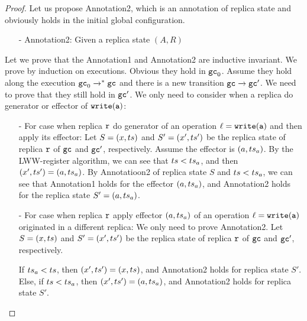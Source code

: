 \begin {proof}
Let us propose Annotation2, which is an annotation of replica state and obviously holds in the initial global configuration.

\begin{itemize}
\setlength{\itemsep}{0.5pt}
\item[-] Annotation2: Given a replica state $(A,R)$
\end{itemize}


Let we prove that the Annotation1 and Annotation2 are inductive invariant. We prove by induction on executions. Obvious they hold in $\mathtt{gc}_0$. Assume they hold along the execution $\mathtt{gc}_0 \xrightarrow{}^* \mathtt{gc}$ and there is a new transition $\mathtt{gc} \xrightarrow{} \mathtt{gc}'$. We need to prove that they still hold in $\mathtt{gc}'$. We only need to consider when a replica do generator or effector of $\alabelshort[{\tt write}]{a}$:

\begin{itemize}
\setlength{\itemsep}{0.5pt}
\item[-] For case when replica $\mathtt{r}$ do generator of an operation $\alabel = \alabelshort[{\tt write}]{a}$ and then apply its effector: Let $S=(x,ts)$ and $S'=(x',ts')$ be the replica state of replica $\mathtt{r}$ of $\mathtt{gc}$ and $\mathtt{gc}'$, respectively. Assume the effector is $(a,ts_a)$. By the LWW-register algorithm, we can see that $ts<ts_a$, and then $(x',ts')=(a,ts_a)$. By Annotatioon2 of replica state $S$ and $ts<ts_a$, we can see that Annotation1 holds for the effector $(a,ts_a)$, and Annotation2 holds for the replica state $S'=(a,ts_a)$.

\item[-] For case when replica $\mathtt{r}$ apply effector $(a,ts_a)$ of an operation $\alabel = \alabelshort[{\tt write}]{a}$ originated in a different replica: We only need to prove Annotation2. Let $S=(x,ts)$ and $S'=(x',ts')$ be the replica state of replica $\mathtt{r}$ of $\mathtt{gc}$ and $\mathtt{gc}'$, respectively.

    If $ts_a < ts$, then $(x',ts') = (x,ts)$, and Annotation2 holds for replica state $S'$. Else, if $ts < ts_a$, then $(x',ts') = (a,ts_a)$, and Annotation2 holds for replica state $S'$.
\end{itemize}


\end{proof}
